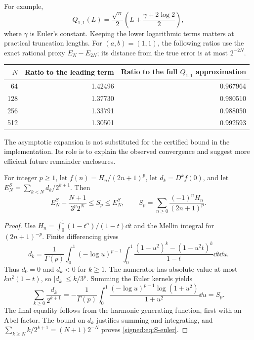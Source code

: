 For example,
\begin{equation}\label{signed:eq:Q11}
 Q_{1,1}(L)=\frac{\sqrt\pi}{2}
       \left(L+\frac{\gamma+2\log2}{2}\right),
\end{equation}
where $\gamma$ is Euler's constant. Keeping the lower logarithmic terms matters at practical truncation lengths. For $(a,b)=(1,1)$, the following ratios use the exact rational proxy $E_N-E_{2N}$; its distance from the true error is at most $2^{-2N}$.
\begin{center}
\begin{tabular}{@{}rrr@{}}
\toprule
$N$ & Ratio to the leading term & Ratio to the full $Q_{1,1}$ approximation\\
\midrule
64 &1.42496&0.967964\\
128&1.37730&0.980510\\
256&1.33791&0.988050\\
512&1.30501&0.992593\\
\bottomrule
\end{tabular}
\end{center}
The asymptotic expansion is not substituted for the certified bound in the implementation. Its role is to explain the observed convergence and suggest more efficient future remainder enclosures.

\begin{proposition}\label{signed:prop:S-euler}
For integer $p\ge1$, let $f(n)=H_n/(2n+1)^p$, let $d_k=D^kf(0)$, and let $E_N^S=\sum_{k<N}d_k/2^{k+1}$. Then
\begin{equation}\label{signed:eq:S-euler}
 E_N^S-\frac{N+1}{3^p2^N}\le S_p\le E_N^S,
 \qquad S_p=\sum_{n\ge0}\frac{(-1)^nH_n}{(2n+1)^p}.
\end{equation}
\end{proposition}
\begin{proof}
Use $H_n=\int_0^1(1-t^n)/(1-t)\dd t$ and the Mellin integral for $(2n+1)^{-p}$. Finite differencing gives
\[
 d_k=\frac1{\Gamma(p)}\int_0^1(-\log u)^{p-1}
  \int_0^1\frac{(1-u^2)^k-(1-u^2t)^k}{1-t}\dd t\dd u.
\]
Thus $d_0=0$ and $d_k<0$ for $k\ge1$. The numerator has absolute value at most $ku^2(1-t)$, so $|d_k|\le k/3^p$. Summing the Euler kernels yields
\[
 \sum_{k\ge0}\frac{d_k}{2^{k+1}}
 =-\frac1{\Gamma(p)}\int_0^1
  \frac{(-\log u)^{p-1}\log(1+u^2)}{1+u^2}\dd u=S_p.
\]
The final equality follows from the harmonic generating function, first with an Abel factor. The bound on $d_k$ justifies summing and integrating, and
$\sum_{k\ge N}k/2^{k+1}=(N+1)2^{-N}$ proves \eqref{signed:eq:S-euler}.
\end{proof}

